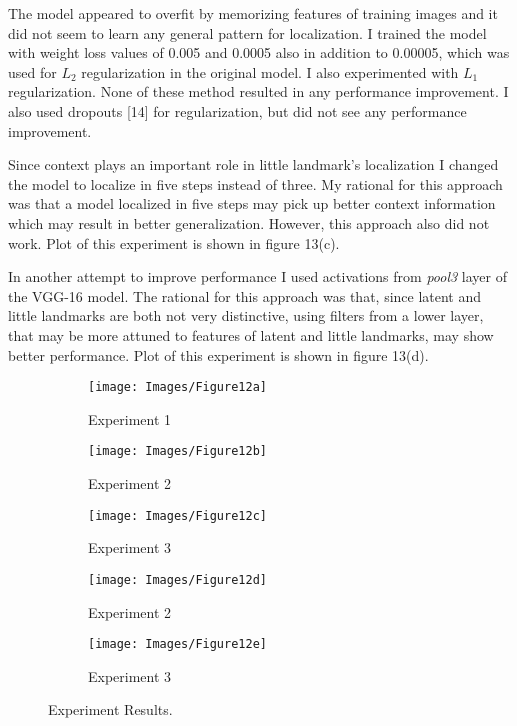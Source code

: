 \documentclass [11pt,letterpaper ,twoside ,openany ]{report}
\begin{document}
    The model appeared to overfit by memorizing features of training images and it did not seem to learn any general pattern for localization. I trained the model with weight loss values of 0.005 and 0.0005 also in addition to 0.00005, which was used for \(L_2\) regularization in the original model. I also experimented with \(L_1\) regularization. None of these method resulted in any performance improvement. I also used dropouts [14] for regularization, but did not see any performance improvement.

    Since context plays an important role in little landmark's localization I changed the model to localize in five steps instead of three. My rational for this approach was that a model localized in five steps may pick up better context information which may result in better generalization. However, this approach also did not work. Plot of this experiment is shown in figure 13(c).

    In another attempt to improve performance I used activations from \textit{pool3} layer of the VGG-16 model. The rational for this approach was that, since latent and little landmarks are both not very distinctive, using filters from a lower layer, that may be more attuned to features of latent and little landmarks, may show better performance. Plot of this experiment is shown in figure 13(d).\\

    \begin{figure}[t!]
    \centering
        \begin{subfigure}[b]{.45\linewidth}
            \texttt{[image: Images/Figure12a]}
            \caption{Experiment 1}
        \end{subfigure}

        \begin{subfigure}[b]{.45\linewidth}
            \texttt{[image: Images/Figure12b]}
            \caption{Experiment 2}
        \end{subfigure}
        \begin{subfigure}[b]{.45\linewidth}
            \texttt{[image: Images/Figure12c]}
            \caption{Experiment 3}
        \end{subfigure}        

        \begin{subfigure}[b]{.45\linewidth}
            \texttt{[image: Images/Figure12d]}
            \caption{Experiment 2}
        \end{subfigure}
        \begin{subfigure}[b]{.45\linewidth}
            \texttt{[image: Images/Figure12e]}
            \caption{Experiment 3}
        \end{subfigure}                
        \caption{Experiment Results.}
    \end{figure}   
\end{document}
